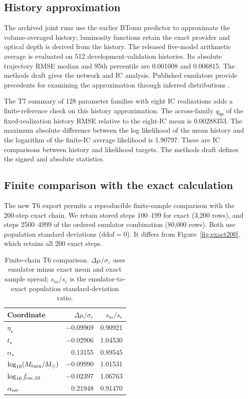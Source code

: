 \subsection{History approximation}\label{reported-history-accuracy}

The archived joint runs use the earlier BTemu predictor to approximate the volume-averaged history; luminosity functions retain the exact provider and optical depth is derived from the history. The released five-model arithmetic average is evaluated on 512 development-validation histories. Its absolute trajectory RMSE median and 95th percentile are 0.001008 and 0.006815. The methods draft gives the network and IC analysis. Published emulators provide precedents for examining the approximation through inferred distributions \cite{Breitman2024,Breitman2026}.

The T7 summary of 128 parameter families with eight IC realizations adds a finite-reference check on this history approximation. The across-family $q_{90}$ of the fixed-realization history RMSE relative to the eight-IC mean is 0.00288353. The maximum absolute difference between the log likelihood of the mean history and the logarithm of the finite-IC average likelihood is 1.90797. These are IC comparisons between history and likelihood targets. The methods draft defines the signed and absolute statistics.

\subsection{Finite comparison with the exact calculation}

The new T6 export permits a reproducible finite-sample comparison with the 200-step exact chain. We retain stored steps 100--199 for exact (3,200 rows), and steps 2500--4999 of the ordered emulator combination (80,000 rows). Both use population standard deviations ($\mathrm{ddof}=0$). It differs from Figure~\ref{fig:exact200}, which retains all 200 exact steps.

\begin{table}[t]\centering\small
\caption{Finite-chain T6 comparison. $\Delta\mu/\sigma_e$ uses emulator minus exact mean and exact sample spread; $s_m/s_e$ is the emulator-to-exact population standard-deviation ratio.}\label{tab:t6}
\begin{tabular}{lrr}\toprule
Coordinate & $\Delta\mu/\sigma_e$ & $s_m/s_e$\\\midrule
$\eta_\star$ & $-0.09969$ & 0.90921\\
$t_\star$ & $-0.02906$ & 1.04530\\
$\alpha_\star$ & 0.13155 & 0.89545\\
$\log_{10}(M_{\rm turn}/M_\odot)$ & $-0.09990$ & 1.01531\\
$\log_{10}f_{{\rm esc},10}$ & $-0.02397$ & 1.06763\\
$\alpha_{\rm esc}$ & 0.21948 & 0.91470\\\bottomrule
\end{tabular}\end{table}

